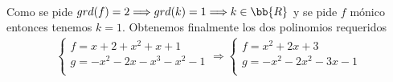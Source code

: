 \documentclass[12pt]{article}
\begin{document}
\begin{ejercicio} [1,25 puntos]
\begin{align*}
        \end{align*}
        Como se pide $grd(f)=2\Longrightarrow grd(k)=1\Longrightarrow k\in\bb{R}$ y se pide $f$ mónico entonces tenemos $k=1$. Obtenemos
        finalmente los dos polinomios requeridos
        \begin{align*}
            \left\{\begin{array}{l}
                f=x+2+x^2+x+1 \\
                g=-x^2-2x-x^3-x^2-1\\
            \end{array}\right. \Longrightarrow 
            \left\{\begin{array}{l}
                f=x^2+2x+3 \\
                g=-x^2-2x^2-3x-1\\
            \end{array}\right. 
        \end{align*}
    \end{ejercicio}
\end{document}
